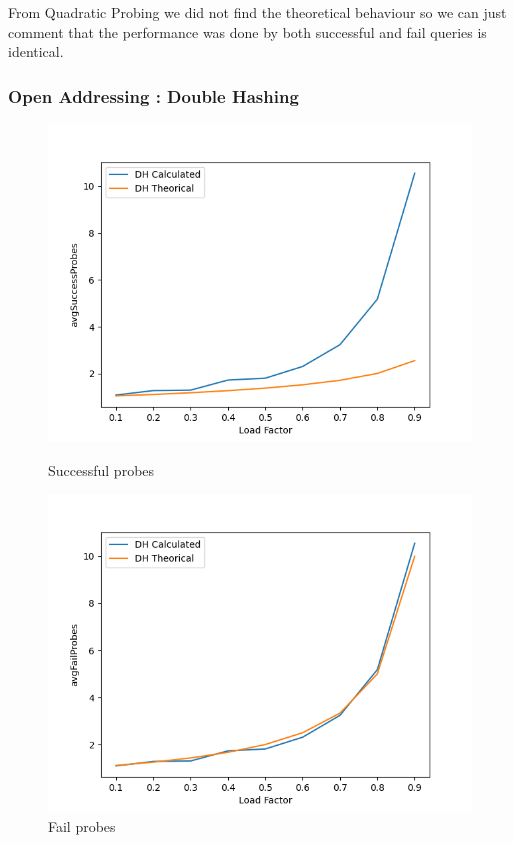 \documentclass{article}
\begin{document}
    From Quadratic Probing we did not find the theoretical behaviour so we can just comment that the performance was done by both successful and fail queries is identical. 
    
    \subsubsection*{Open Addressing : Double Hashing}

        \begin{figure}[H]
          \includegraphics[width=\linewidth]{images/loadFactor_vs_avgSuccessProbes_DH.png}
          \caption{Successful probes}\label{fig:plot8}
        \endminipage\hfill
          \includegraphics[width=\linewidth]{images/loadFactor_vs_avgFailProbes_DH.png}
          \caption{Fail probes}\label{fig:plot9}
        \endminipage
    \end{figure}
    
\end{document}
